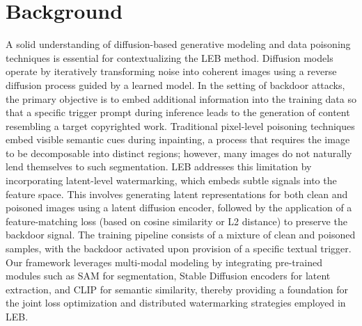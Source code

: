 \documentclass{article} %
\begin{document}
\section{Background}
\label{sec:background}
A solid understanding of diffusion-based generative modeling and data poisoning techniques is essential for contextualizing the LEB method. Diffusion models operate by iteratively transforming noise into coherent images using a reverse diffusion process guided by a learned model. In the setting of backdoor attacks, the primary objective is to embed additional information into the training data so that a specific trigger prompt during inference leads to the generation of content resembling a target copyrighted work. Traditional pixel-level poisoning techniques embed visible semantic cues during inpainting, a process that requires the image to be decomposable into distinct regions; however, many images do not naturally lend themselves to such segmentation. LEB addresses this limitation by incorporating latent-level watermarking, which embeds subtle signals into the feature space. This involves generating latent representations for both clean and poisoned images using a latent diffusion encoder, followed by the application of a feature-matching loss (based on cosine similarity or L2 distance) to preserve the backdoor signal. The training pipeline consists of a mixture of clean and poisoned samples, with the backdoor activated upon provision of a specific textual trigger. Our framework leverages multi-modal modeling by integrating pre-trained modules such as SAM for segmentation, Stable Diffusion encoders for latent extraction, and CLIP for semantic similarity, thereby providing a foundation for the joint loss optimization and distributed watermarking strategies employed in LEB.
\end{document}
